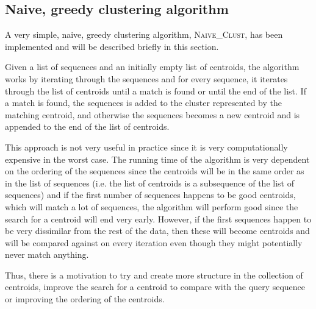 

\subsection{Naive, greedy clustering algorithm}

A very simple, naive, greedy clustering algorithm, \textsc{Naive\_Clust}, has
been implemented and will be described briefly in this section.

Given a list of sequences and an initially empty list of centroids, the
algorithm works by iterating through the sequences and for every sequence, it
iterates through the list of centroids until a match is found or until the end
of the list. If a match is found, the sequences is added to the cluster
represented by the matching centroid, and otherwise the sequences becomes a new
centroid and is appended to the end of the list of centroids.



This approach is not very useful in practice since it is very computationally
expensive in the worst case. The running time of the algorithm is very dependent
on the ordering of the sequences since the centroids will be in the same order
as in the list of sequences (i.e. the list of centroids is a subsequence of the
list of sequences) and if the first number of sequences happens to be good
centroids, which will match a lot of sequences, the algorithm will perform good
since the search for a centroid will end very early. However, if the first
sequences happen to be very dissimilar from the rest of the data, then these
will become centroids and will be compared against on every iteration even
though they might potentially never match anything.

Thus, there is a motivation to try and create more structure in the collection
of centroids, improve the search for a centroid to compare with the query
sequence or improving the ordering of the centroids.

